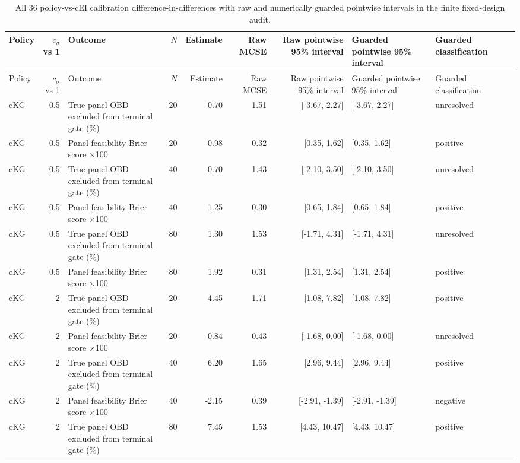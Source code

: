 \begin{longtable}{p{1.9cm}rp{3.1cm}rrrrp{2.7cm}p{2.7cm}p{1.5cm}}
\caption{All 36 policy-vs-cEI calibration difference-in-differences with raw and numerically guarded pointwise intervals in the finite fixed-design audit.}\label{tab:budget-toxicity-calibration-policy-cei-did}\\
\toprule
Policy & $c_\sigma$ vs 1 & Outcome & $N$ & Estimate & Raw MCSE & Raw pointwise 95\% interval & Guarded pointwise 95\% interval & Guarded classification \\
\midrule
\endfirsthead
\toprule
Policy & $c_\sigma$ vs 1 & Outcome & $N$ & Estimate & Raw MCSE & Raw pointwise 95\% interval & Guarded pointwise 95\% interval & Guarded classification \\
\midrule
\endhead
cKG & 0.5 & True panel OBD excluded from terminal gate (\%) & 20 & -0.70 & 1.51 & [-3.67, 2.27] & [-3.67, 2.27] & unresolved \\
cKG & 0.5 & Panel feasibility Brier score $\times$100 & 20 & 0.98 & 0.32 & [0.35, 1.62] & [0.35, 1.62] & positive \\
cKG & 0.5 & True panel OBD excluded from terminal gate (\%) & 40 & 0.70 & 1.43 & [-2.10, 3.50] & [-2.10, 3.50] & unresolved \\
cKG & 0.5 & Panel feasibility Brier score $\times$100 & 40 & 1.25 & 0.30 & [0.65, 1.84] & [0.65, 1.84] & positive \\
cKG & 0.5 & True panel OBD excluded from terminal gate (\%) & 80 & 1.30 & 1.53 & [-1.71, 4.31] & [-1.71, 4.31] & unresolved \\
cKG & 0.5 & Panel feasibility Brier score $\times$100 & 80 & 1.92 & 0.31 & [1.31, 2.54] & [1.31, 2.54] & positive \\
cKG & 2 & True panel OBD excluded from terminal gate (\%) & 20 & 4.45 & 1.71 & [1.08, 7.82] & [1.08, 7.82] & positive \\
cKG & 2 & Panel feasibility Brier score $\times$100 & 20 & -0.84 & 0.43 & [-1.68, 0.00] & [-1.68, 0.00] & unresolved \\
cKG & 2 & True panel OBD excluded from terminal gate (\%) & 40 & 6.20 & 1.65 & [2.96, 9.44] & [2.96, 9.44] & positive \\
cKG & 2 & Panel feasibility Brier score $\times$100 & 40 & -2.15 & 0.39 & [-2.91, -1.39] & [-2.91, -1.39] & negative \\
cKG & 2 & True panel OBD excluded from terminal gate (\%) & 80 & 7.45 & 1.53 & [4.43, 10.47] & [4.43, 10.47] & positive \\

\end{longtable}
